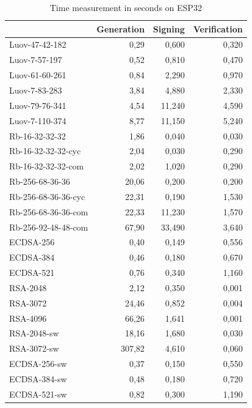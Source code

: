\documentclass[thesis=M,english]{FITthesis}[2019/12/23]
\begin{document}
\begin{table}[]
\centering
\begin{tabular}{|l|r|r|r|}
\hline
& \multicolumn{1}{c|}{{ Generation}} & \multicolumn{1}{c|}{{ Signing}} & \multicolumn{1}{c|}{{ Verification}} \\ \hline
Luov-47-42-182 & 0,29 & 0,600 & 0,320 \\ \hline
Luov-7-57-197 & 0,52 & 0,810 & 0,470 \\ \hline
Luov-61-60-261 & 0,84 & 2,290 & 0,970 \\ \hline
Luov-7-83-283 & 3,84 & 4,880 & 2,330 \\ \hline
Luov-79-76-341 & 4,54 & 11,240 & 4,590 \\ \hline
Luov-7-110-374 & 8,77 & 11,150 & 5,240 \\ \hline
Rb-16-32-32-32 & 1,86 & 0,040 & 0,030 \\ \hline
Rb-16-32-32-32-cyc & 2,04 & 0,030 & 0,290 \\ \hline
Rb-16-32-32-32-com & 2,02 & 1,020 & 0,290 \\ \hline
Rb-256-68-36-36 & 20,06 & 0,200 & 0,200 \\ \hline
Rb-256-68-36-36-cyc & 22,31 & 0,190 & 1,530 \\ \hline
Rb-256-68-36-36-com & 22,33 & 11,230 & 1,570 \\ \hline
Rb-256-92-48-48-com & 67,90 & 33,490 & 3,640 \\ \hline
ECDSA-256 & 0,40 & 0,149 & 0,556 \\ \hline
ECDSA-384 & 0,46 & 0,180 & 0,670 \\ \hline
ECDSA-521 & 0,76 & 0,340 & 1,160 \\ \hline
RSA-2048 & 2,12 & 0,350 & 0,001 \\ \hline
RSA-3072 & 24,46 & 0,852 & 0,004 \\ \hline
RSA-4096 & 66,26 & 1,641 & 0,001 \\ \hline
RSA-2048-sw & 18,16 & 1,680 & 0,030 \\ \hline
RSA-3072-sw & 307,82 & 4,610 & 0,060 \\ \hline
ECDSA-256-sw & 0,37 & 0,150 & 0,550 \\ \hline
ECDSA-384-sw & 0,48 & 0,180 & 0,720 \\ \hline
ECDSA-521-sw & 0,82 & 0,300 & 1,190 \\ \hline
\end{tabular}
\caption{Time measurement in seconds on ESP32}
\end{table}
\end{document}
